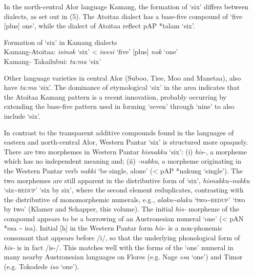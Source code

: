 {In the north-central Alor language Kamang, the formation of `six' differs between dialects, as set out in (5). The Atoitaa dialect has a base-five compound of `five [plus] one', while the dialect of Atoitaa reflect p\textsc{AP} *talam `six'.



\ea%
\label{ex:5}
Formation of `six' in Kamang dialects\\
\gll  Kamang{}-Atoitaa:     \textit{isi}\textit{{\ng}}\textit{nok}\textbf{} `six'     {\textless} \textit{iwesi}\textit{{\ng}} `five' [plus] \textit{nok} `one'\\
    Kamang{}- Takailubui:    \textit{ta:ma} `six'      \\
\z





Other language varieties in central Alor (Suboo, Tiee, Moo and Manetaa), also have \textit{ta:ma} `six'. The dominance of etymological `six' in the area indicates that the Atoitaa Kamang pattern is a recent innovation, probably occurring by extending the base-five pattern used in forming `seven' through `nine' to also include `six'.

In contrast to the transparent additive compounds found in the languages of eastern and north-central Alor, Western Pantar `six' is structured more opaquely. There are two morphemes in Western Pantar \textit{hisnakku}\textit{{\ng}} `six': (i) \textit{his-}, a morpheme which has no independent meaning and; (ii) \textit{{}-nakku}\textit{{\ng}}, a morpheme originating in the Western Pantar verb \textit{nakki}\textit{{\ng}} `be single, alone' ({\textless} pAP *nakung `single'). The two morphemes are still apparent in the distributive form of `six', \textit{hisnakku}\textit{{\ng}}\textit{\~{}nakku}\textit{{\ng}} `six\~{}\textsc{redup}' `six by six', where the second element reduplicates, contrasting with the distributive of monomorphemic numerals, e.g., \textit{alaku\~{}alaku} `two\~{}\textsc{redup}' `two by two' (Klamer and Schapper, this volume). The initial \textit{his-} morpheme of the compound appears to be a borrowing of an Austronesian numeral `one' ({\textless} pAN *esa \~{} isa). Initial [h] in the Western Pantar form \textit{his-} is a non-phonemic consonant that appears before /i/, so that the underlying phonological form of \textit{his-} is in fact /is-/. This matches well with the forms of the `one' numeral in many nearby Austronesian languages on Flores (e.g. Nage \textit{esa} `one') and Timor (e.g. Tokodede \textit{iso} `one').

}

